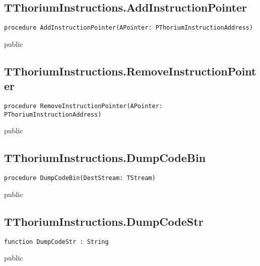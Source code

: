 \subsection{TThoriumInstructions.AddInstructionPointer}
\label{thoriumcore:thorium:tthoriuminstructions:addinstructionpointer}
\begin{FPCList}
\Synopsis
\Declaration 

\begin{verbatim}
procedure AddInstructionPointer(APointer: PThoriumInstructionAddress)
\end{verbatim}
\Visibility
public
\Description
\Errors
\end{FPCList}
\subsection{TThoriumInstructions.RemoveInstructionPointer}
\label{thoriumcore:thorium:tthoriuminstructions:removeinstructionpointer}
\begin{FPCList}
\Synopsis
\Declaration 

\begin{verbatim}
procedure RemoveInstructionPointer(APointer: PThoriumInstructionAddress)
\end{verbatim}
\Visibility
public
\Description
\Errors
\end{FPCList}
\subsection{TThoriumInstructions.DumpCodeBin}
\label{thoriumcore:thorium:tthoriuminstructions:dumpcodebin}
\begin{FPCList}
\Synopsis
\Declaration 

\begin{verbatim}
procedure DumpCodeBin(DestStream: TStream)
\end{verbatim}
\Visibility
public
\Description
\Errors
\end{FPCList}
\subsection{TThoriumInstructions.DumpCodeStr}
\label{thoriumcore:thorium:tthoriuminstructions:dumpcodestr}
\begin{FPCList}
\Synopsis
\Declaration 

\begin{verbatim}
function DumpCodeStr : String
\end{verbatim}
\Visibility
public
\Description
\Errors
\end{FPCList}
